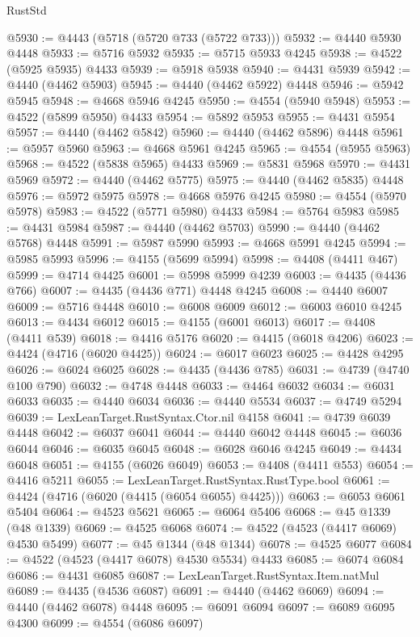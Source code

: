 \begin{lexlean}{RustStd}
\begin{coremodule}
@5930 := @4443 (@5718 (@5720 @733 (@5722 @733)))
@5932 := @4440 @5930 @4448
@5933 := @5716 @5932
@5935 := @5715 @5933 @4245
@5938 := @4522 (@5925 @5935) @4433
@5939 := @5918 @5938
@5940 := @4431 @5939
@5942 := @4440 (@4462 @5903)
@5945 := @4440 (@4462 @5922) @4448
@5946 := @5942 @5945
@5948 := @4668 @5946 @4245
@5950 := @4554 (@5940 @5948)
@5953 := @4522 (@5899 @5950) @4433
@5954 := @5892 @5953
@5955 := @4431 @5954
@5957 := @4440 (@4462 @5842)
@5960 := @4440 (@4462 @5896) @4448
@5961 := @5957 @5960
@5963 := @4668 @5961 @4245
@5965 := @4554 (@5955 @5963)
@5968 := @4522 (@5838 @5965) @4433
@5969 := @5831 @5968
@5970 := @4431 @5969
@5972 := @4440 (@4462 @5775)
@5975 := @4440 (@4462 @5835) @4448
@5976 := @5972 @5975
@5978 := @4668 @5976 @4245
@5980 := @4554 (@5970 @5978)
@5983 := @4522 (@5771 @5980) @4433
@5984 := @5764 @5983
@5985 := @4431 @5984
@5987 := @4440 (@4462 @5703)
@5990 := @4440 (@4462 @5768) @4448
@5991 := @5987 @5990
@5993 := @4668 @5991 @4245
@5994 := @5985 @5993
@5996 := @4155 (@5699 @5994)
@5998 := @4408 (@4411 @467)
@5999 := @4714 @4425
@6001 := @5998 @5999 @4239
@6003 := @4435 (@4436 @766)
@6007 := @4435 (@4436 @771) @4448 @4245
@6008 := @4440 @6007
@6009 := @5716 @4448
@6010 := @6008 @6009
@6012 := @6003 @6010 @4245
@6013 := @4434 @6012
@6015 := @4155 (@6001 @6013)
@6017 := @4408 (@4411 @539)
@6018 := @4416 @5176
@6020 := @4415 (@6018 @4206)
@6023 := @4424 (@4716 (@6020 @4425))
@6024 := @6017 @6023
@6025 := @4428 @4295
@6026 := @6024 @6025
@6028 := @4435 (@4436 @785)
@6031 := @4739 (@4740 @100 @790)
@6032 := @4748 @4448
@6033 := @4464 @6032
@6034 := @6031 @6033
@6035 := @4440 @6034
@6036 := @4440 @5534
@6037 := @4749 @5294
@6039 := LexLeanTarget.RustSyntax.Ctor.nil @4158
@6041 := @4739 @6039 @4448
@6042 := @6037 @6041
@6044 := @4440 @6042 @4448
@6045 := @6036 @6044
@6046 := @6035 @6045
@6048 := @6028 @6046 @4245
@6049 := @4434 @6048
@6051 := @4155 (@6026 @6049)
@6053 := @4408 (@4411 @553)
@6054 := @4416 @5211
@6055 := LexLeanTarget.RustSyntax.RustType.bool
@6061 := @4424 (@4716 (@6020 (@4415 (@6054 @6055) @4425)))
@6063 := @6053 @6061 @5404
@6064 := @4523 @5621
@6065 := @6064 @5406
@6068 := @45 @1339 (@48 @1339)
@6069 := @4525 @6068
@6074 := @4522 (@4523 (@4417 @6069) @4530 @5499)
@6077 := @45 @1344 (@48 @1344)
@6078 := @4525 @6077
@6084 := @4522 (@4523 (@4417 @6078) @4530 @5534) @4433
@6085 := @6074 @6084
@6086 := @4431 @6085
@6087 := LexLeanTarget.RustSyntax.Item.natMul
@6089 := @4435 (@4536 @6087)
@6091 := @4440 (@4462 @6069)
@6094 := @4440 (@4462 @6078) @4448
@6095 := @6091 @6094
@6097 := @6089 @6095 @4300
@6099 := @4554 (@6086 @6097)

\end{coremodule}
\end{lexlean}
